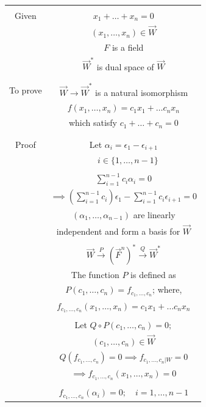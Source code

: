 \begin{table}[ht]
\begin{center}
\begin{tabular}{|c|c|}
\hline
& \\
Given & $x_1+ \hdots+x_n = 0$ \\
& $(x_1, \hdots , x_n) \in \vec{W}$\\
& $F$ is a field\\
& $\vec{W}^*$ is dual space of $\vec{W}$ \\
& \\
\hline
& \\
To prove & $\vec{W} \xrightarrow{} \vec{W}^*$ is a natural isomorphism\\
& $f(x_1, \hdots , x_n) = c_1x_1 + \hdots c_nx_n$\\
& which satisfy $c_1 + \hdots + c_n = 0$\\
& \\
\hline
& \\
Proof & Let $\alpha_i = \epsilon_1 - \epsilon_{i+1}$ \\ 
& $\quad i \in \{1,\hdots, n-1\}$ \\
& \\
& $\sum_{i=1}^{n-1} c_i \alpha_i = 0$ \\
& $\implies \left(\sum_{i=1}^{n-1} c_i \right) \epsilon_1 - \sum_{i=1}^{n-1} c_i \epsilon_{i+1} = 0$ \\
& $(\alpha_1, \hdots, \alpha_{n-1})$ are linearly\\
& independent and form a basis for $\vec{W}$ \\
& \\
& $\vec{W} \xrightarrow{P} (\vec{F}^n)^* \xrightarrow{Q} \vec{W}^*$ \\
& The function $P$ is defined as \\
& $P(c_1,\hdots,c_n) = f_{c_1,\hdots,c_n}$; where, \\
& $f_{c_1,\hdots,c_n}(x_1, \hdots , x_n) = c_1x_1 + \hdots c_nx_n$ \\
& \\
& Let $Q \circ P (c_1,\hdots,c_n) = 0;$ \\
& $(c_1,\hdots,c_n) \in \vec{W}$ \\
& $Q(f_{c_1,\hdots,c_n}) = 0 \implies f_{c_1,\hdots,c_n|W} = 0$ \\
& $\implies f_{c_1,\hdots,c_n}(x_1, \hdots , x_n) = 0$ \\
& \\
& $f_{c_1,\hdots,c_n}(\alpha_i) = 0; \quad i = 1,\hdots,n-1$ \\

\end{tabular}
\end{center}
\end{table}
